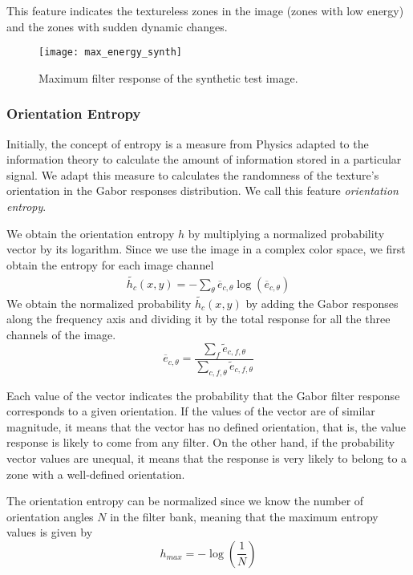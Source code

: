 This feature indicates the textureless zones in the image (zones with low energy) and the zones with sudden dynamic changes.

\begin{figure}[!ht]
	\texttt{[image: max\_energy\_synth]}
    \caption{Maximum filter response of the synthetic test image.}
    \label{fig:max_energy_synth}
\end{figure}

\subsubsection{Orientation Entropy}
Initially, the concept of entropy is a measure from Physics adapted to the information theory to calculate the amount of information stored in a particular signal. We adapt this measure to calculates the randomness of the texture's orientation in the Gabor responses distribution. We call this feature \textit{orientation entropy}.

We obtain the orientation entropy $h$ by multiplying a normalized probability vector by its logarithm. Since we use the image in a complex color space, we first obtain the entropy for each image channel
\begin{gather}
    \widetilde{h_c}(x,y) = -\sum_{\theta} \overline{e}_{c, \theta} \log (\overline{e}_{c, \theta}) \label{eq:entropy_orient_ch}
\end{gather}
We obtain the normalized probability $\widetilde{h_c}(x,y)$ by adding the Gabor responses along the frequency axis and dividing it by the total response for all the three channels of the image.
\begin{equation}
	\overline{e}_{c, \theta} =  \frac{\sum_f \widetilde{e}_{c, f, \theta}}{\sum_{c, f, \theta}\widetilde{e}_{c, f, \theta} }  \label{eq:gabor_energy_ch_orient_prob}
\end{equation}

Each value of the vector indicates the probability that the Gabor filter response corresponds to a given orientation. If the values of the vector are of similar magnitude, it means that the vector has no defined orientation, that is, the value response is likely to come from any filter. On the other hand, if the probability vector values are unequal, it means that the response is very likely to belong to a zone with a well-defined orientation.

The orientation entropy can be normalized since we know the number of orientation angles $N$ in the filter bank, meaning that the maximum entropy values is given by 
\begin{equation}
    h_{max} = -\log\left(\frac{1}{N}\right) \label{eq:max_entropy_orient} 
\end{equation}

